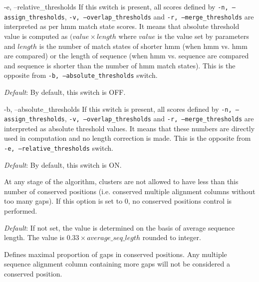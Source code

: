 \documentclass[11pt, a4paper, twoside, titlepage]{article}
\begin{document}
\begin{description}
\begin{sloppypar}
\end{sloppypar}	

\begin{sloppypar}	
	  
	  \item[-e, --relative\_thresholds] If this switch is present, all scores defined by \texttt{-n, --assign\_thresholds}, \texttt{-v, --overlap\_thresholds} and \texttt{-r, --merge\_thresholds} are interpreted as per hmm match state scores. It means that absolute threshold value is computed as $(value\times length$ where $value$ is the value set by parameters and $length$ is the number of match states of shorter hmm (when hmm vs. hmm are compared) or the length of sequence (when hmm vs. sequence are compared and sequence is shorter than the number of hmm match states). This is the opposite from \texttt{-b, --absolute\_thresholds} switch.
	  
\end{sloppypar}	
	  
	    \textit{Default}: By default, this switch is OFF.
	
\begin{sloppypar}	
	  \item[-b, --absolute\_thresholds] If this switch is present, all scores defined by \texttt{-n, --assign\_thresholds}, \texttt{-v, --overlap\_thresholds} and \texttt{-r, --merge\_thresholds} are interpreted as absolute threshold values. It means that these numbers are directly used in computation and no length correction is made. This is the opposite from \texttt{-e, --relative\_thresholds} switch.
	
\end{sloppypar}	
	  
	    \textit{Default}: By default, this switch is ON. 
	    
	  
	  	  \item[-h, --min\_conserved\_positions \rm \textlangle \textit{int}\textrangle] At any stage of the algorithm, clusters are not allowed to have less than this number of conserved positions (i.e. conserved multiple alignment columns without too many gaps). If this option is set to 0, no conserved positions control is performed. 
	  	  
	  	  \textit{Default}: If not set, the value is determined on the basis of average sequence length. The value is $0.33 \times average\_seq\_legth$ rounded to integer.
	  	  
	  	  	  	  \item[-y, --max\_gap\_proportion \rm \textlangle \textit{float}\textrangle] 
	  	  	  	  Defines maximal proportion of gaps in conserved positions. Any multiple sequence alignment column containing more gaps will not be considered a conserved position.
	  	  

\end{description}
\end{document}
